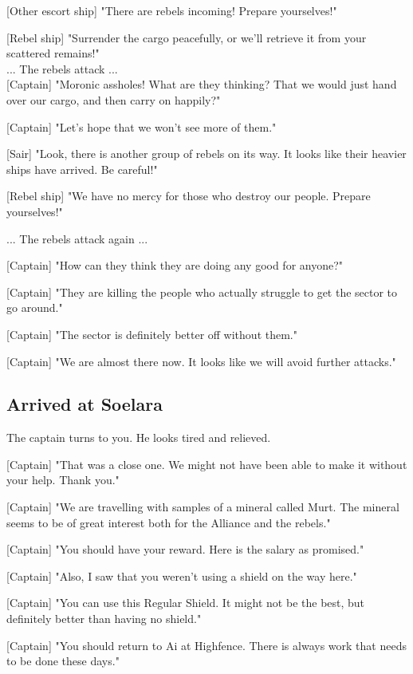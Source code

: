 \documentclass[a4paper,12pt]{article}
\begin{document}
[Other escort ship] "There are rebels incoming! Prepare yourselves!"

[Rebel ship] "Surrender the cargo peacefully, or we'll retrieve it from
your scattered remains!"\\

... The rebels attack ...\\

[Captain] "Moronic assholes! What are they thinking? That we would just hand over our cargo,
and then carry on happily?" 

[Captain] "Let's hope that we won't see more of them."

[Sair] "Look, there is another group of rebels on its way. It looks like
their heavier ships have arrived. Be careful!"

[Rebel ship] "We have no mercy for those who destroy our people. 
Prepare yourselves!"

... The rebels attack again ...

[Captain] "How can they think they are doing any good for anyone?" 

[Captain] "They are killing the people who actually struggle to get the sector to go around."

[Captain] "The sector is definitely better off without them."

[Captain] "We are almost there now. It looks like we will avoid further attacks."

\subsection{Arrived at Soelara}

The captain turns to you. He looks tired and relieved. 

[Captain] "That was a close one. We might not have been able to make it without your help. 
Thank you."

[Captain] "We are travelling with samples of a mineral called Murt. The mineral seems to be of great
interest both for the Alliance and the rebels."

[Captain] "You should have your reward. Here is the salary as promised."
 
[Captain] "Also, I saw that you weren't using a shield on the way here."

[Captain] "You can use this Regular Shield. It might not be the best, 
but definitely better than having no shield."

[Captain] "You should return to Ai at Highfence. There is always work that needs to be done these days."
\end{document}

